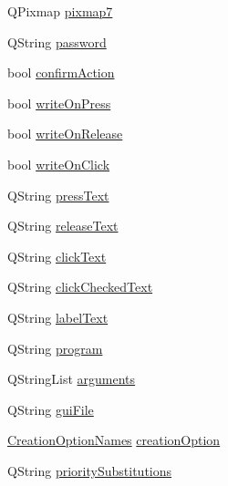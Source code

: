 \begin{DoxyCompactItemize}
\item 
QPixmap \hyperlink{classQECheckBox_a191f0d0d6c409c8e0a30cd54f311e978}{pixmap7}
\item 
QString \hyperlink{classQECheckBox_ab0927b9fabc924adfd3a80b427d20d76}{password}
\item 
bool \hyperlink{classQECheckBox_a7f332a10d02872f2435fae04bbd72c67}{confirmAction}
\item 
bool \hyperlink{classQECheckBox_aa4f1c788edfa6ad9573052d8832e7f37}{writeOnPress}
\item 
bool \hyperlink{classQECheckBox_a0b524a42857130ebc8301c2a8952d5ca}{writeOnRelease}
\item 
bool \hyperlink{classQECheckBox_af0b9c9339a5525ae5e4d2057e7bbd073}{writeOnClick}
\item 
QString \hyperlink{classQECheckBox_a2e9e454ca0bed2cb95d8069ce054c492}{pressText}
\item 
QString \hyperlink{classQECheckBox_a2fd7458304d7628495fa0e6d8ef06d15}{releaseText}
\item 
QString \hyperlink{classQECheckBox_ab31f93b7e07ba016b28526647891d1c2}{clickText}
\item 
QString \hyperlink{classQECheckBox_abf6d7c71828fe6e3cd08ed5e15e2c2bd}{clickCheckedText}
\item 
QString \hyperlink{classQECheckBox_a4b5068740488c987e3613ed24c450da6}{labelText}
\item 
QString \hyperlink{classQECheckBox_a96cfc66f8de0a3ecb1e7898756261e26}{program}
\item 
QStringList \hyperlink{classQECheckBox_aa8d15e056222f0ee25e9ee067d2638d0}{arguments}
\item 
QString \hyperlink{classQECheckBox_af90f244040b18450768d30647ab79303}{guiFile}
\item 
\hyperlink{classQECheckBox_ae961d2f2273ccca3b41faf87f0b87cf0}{CreationOptionNames} \hyperlink{classQECheckBox_af6144bd9c21911595b96c8a56913d953}{creationOption}
\item 
QString \hyperlink{classQECheckBox_abbb40c6cf9c0e13687d7a69746cc9a9e}{prioritySubstitutions}
\end{DoxyCompactItemize}


